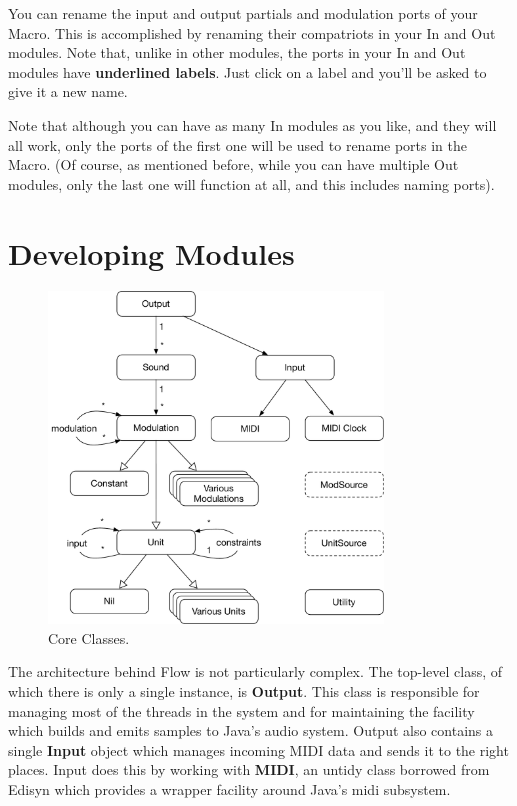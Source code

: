 \documentclass{article}
\newcommand\bump{\vspace{20in}}
\newcommand\name{Flow}
\begin{document}
You can rename the input and output partials and modulation ports of your Macro.  This is accomplished by renaming their compatriots in your In and Out modules.  Note that, unlike in other modules, the ports in your In and Out modules have {\bf underlined labels}.  Just click on a label and you'll be asked to give it a new name.

Note that although you can have as many In modules as you like, and they will all work, only the ports of the first one will be used to rename ports in the Macro.  (Of course, as mentioned before, while you can have multiple Out modules, only the last one will function at all, and this includes naming ports).




\bump
\section{Developing Modules}

\begin{figure}
\vspace{-1em}\includegraphics[width=3.5in]{CoreUML.pdf}
\vspace{-1em}
\caption{Core Classes.}
\vspace{-1em}
\label{hcpanel}
\end{figure}

The architecture behind {\name} is not particularly complex.  The top-level class, of which there is only a single instance, is {\bf Output}. This class is responsible for managing most of the threads in the system and for maintaining the facility which builds and emits samples to Java's audio system.  Output also contains a single {\bf Input} object which manages incoming MIDI data and sends it to the right places.  Input does this by working with {\bf MIDI}, an untidy class borrowed from Edisyn which provides a wrapper facility around Java's midi subsystem.
\end{document}
